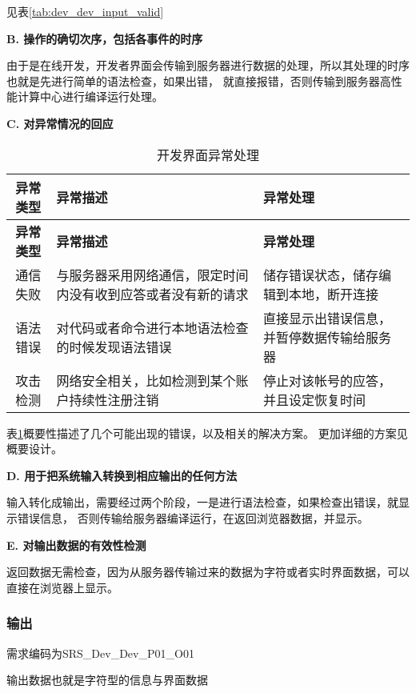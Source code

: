 {见表\ref{tab:dev_dev_input_valid}

\textbf{B. 操作的确切次序，包括各事件的时序}

由于是在线开发，开发者界面会传输到服务器进行数据的处理，所以其处理的时序也就是先进行简单的语法检查，如果出错，
就直接报错，否则传输到服务器高性能计算中心进行编译运行处理。

\textbf{C. 对异常情况的回应}

\begin{longtable}{|c|p{6cm}|p{6cm}|}
\caption{开发界面异常处理}\label{tab:dev_dev_exception} \\
\hline
\textbf{异常类型} & \textbf{异常描述} & \textbf{异常处理}\\
\hline
\endfirsthead
\hline
\textbf{异常类型} & \textbf{异常描述} & \textbf{异常处理}\\
\hline
\endhead
\hline 
\endfoot
\hline
\endlastfoot
通信失败 & 
与服务器采用网络通信，限定时间内没有收到应答或者没有新的请求 &
储存错误状态，储存编辑到本地，断开连接\\
语法错误 & 对代码或者命令进行本地语法检查的时候发现语法错误 & 
直接显示出错误信息，并暂停数据传输给服务器\\
攻击检测 & 网络安全相关，比如检测到某个账户持续性注册注销 &
停止对该帐号的应答，并且设定恢复时间\\
\end{longtable}

表\ref{tab:dev_dev_exception}概要性描述了几个可能出现的错误，以及相关的解决方案。
更加详细的方案见概要设计。



\textbf{D. 用于把系统输入转换到相应输出的任何方法}

输入转化成输出，需要经过两个阶段，一是进行语法检查，如果检查出错误，就显示错误信息，
否则传输给服务器编译运行，在返回浏览器数据，并显示。

\textbf{E. 对输出数据的有效性检测}

返回数据无需检查，因为从服务器传输过来的数据为字符或者实时界面数据，可以直接在浏览器上显示。

\subsubsection{输出}

需求编码为SRS\_Dev\_Dev\_P01\_O01

输出数据也就是字符型的信息与界面数据

}





